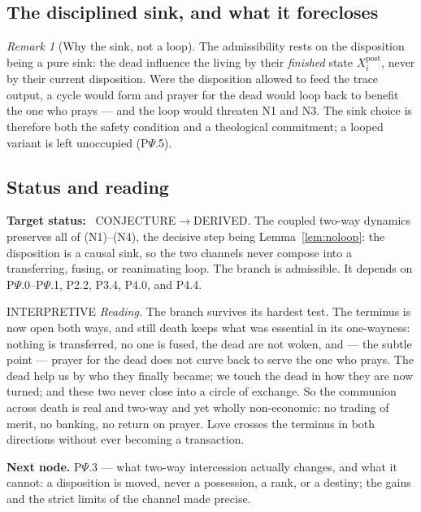 \documentclass[11pt,a4paper]{article}
\newcommand{\stDerived}{\textcolor{cDer}{\textsf{\small DERIVED}}}
\newcommand{\stInterp}{\textcolor{cInt}{\textsf{\small INTERPRETIVE}}}
\newcommand{\stConj}{\textcolor{cCon}{\textsf{\small CONJECTURE}}}
\theoremstyle{definition}
\theoremstyle{plain}
\theoremstyle{remark}
\newtheorem{remark}[definition]{Remark}
\begin{document}
\subsection{The disciplined sink, and what it forecloses}

\begin{remark}[Why the sink, not a loop]\label{rem:sink}
The admissibility rests on the disposition being a pure sink: the dead influence the living by
their \emph{finished} state \(X_i^{\mathrm{post}}\), never by their current disposition. Were
the disposition allowed to feed the trace output, a cycle would form and prayer for the dead
would loop back to benefit the one who prays --- and the loop would threaten N1 and N3. The
sink choice is therefore both the safety condition and a theological commitment; a looped
variant is left unoccupied (P$\Psi$.5).
\end{remark}

\subsection{Status and reading}

\textbf{Target status:}~
\stConj\(\to\)\stDerived. The coupled two-way dynamics preserves all of (N1)--(N4), the
decisive step being Lemma~\ref{lem:noloop}: the disposition is a causal sink, so the two
channels never compose into a transferring, fusing, or reanimating loop. The branch is
admissible. It depends on P$\Psi$.0--P$\Psi$.1, P2.2, P3.4, P4.0, and P4.4.

\medskip
\stInterp\quad
\emph{Reading.}
The branch survives its hardest test. The terminus is now open both ways, and still death
keeps what was essential in its one-wayness: nothing is transferred, no one is fused, the dead
are not woken, and --- the subtle point --- prayer for the dead does not curve back to serve
the one who prays. The dead help us by who they finally became; we touch the dead in how they
are now turned; and these two never close into a circle of exchange. So the communion across
death is real and two-way and yet wholly non-economic: no trading of merit, no banking, no
return on prayer. Love crosses the terminus in both directions without ever becoming a
transaction.

\medskip
\textbf{Next node.} P$\Psi$.3 --- what two-way intercession actually changes, and what it
cannot: a disposition is moved, never a possession, a rank, or a destiny; the gains and the
strict limits of the channel made precise.
\end{document}
